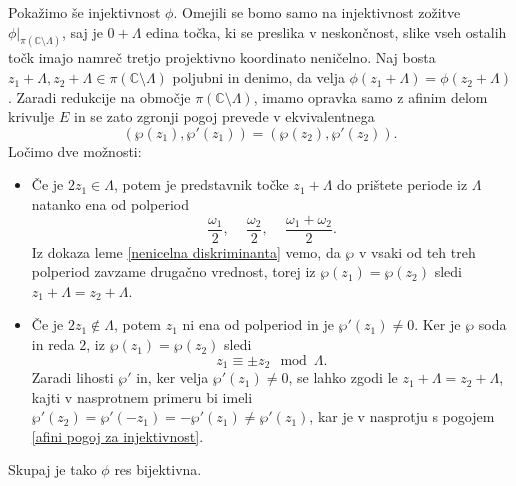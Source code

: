 \documentclass[mat1]{fmfdelo}
\numberwithin{equation}{section}
\newcommand{\C}{\mathbb C}
\newcommand{\om}{\omega}
\theoremstyle{definition}
\begin{document}
\begin{dokaz}
    Pokažimo še injektivnost $\phi$. Omejili se bomo samo na injektivnost zožitve $\phi|_{\pi(\C\setminus\Lambda)}$, saj je $0 + \Lambda$ edina točka, ki se preslika v neskončnost, slike vseh ostalih točk imajo namreč tretjo projektivno koordinato neničelno. Naj bosta $z_1 + \Lambda, z_2 + \Lambda \in \pi(\C \setminus \Lambda)$ poljubni in denimo, da velja $\phi(z_1 + \Lambda) = \phi(z_2 + \Lambda)$. Zaradi redukcije na območje $\pi(\C \setminus \Lambda)$, imamo opravka samo z afinim delom krivulje $E$ in se zato zgronji pogoj prevede v ekvivalentnega 
    \begin{equation}
        \label{afini pogoj za injektivnost}
        (\wp(z_1), \wp'(z_1)) = (\wp(z_2), \wp'(z_2)). 
    \end{equation}  
    Ločimo dve možnosti:
    \begin{itemize}
        \item
        Če je $2z_1 \in \Lambda$, potem je predstavnik točke $z_1 + \Lambda$ do prištete periode iz $\Lambda$ natanko ena od polperiod
        \[
            \frac{\om_1}{2}\text{, } \quad \frac{\om_2}{2}\text{, } \quad \frac{\om_1 + \om_2}{2}.
        \]
        Iz dokaza leme \ref{nenicelna diskriminanta} vemo, da $\wp$ v vsaki od teh treh polperiod zavzame drugačno vrednost, torej iz $\wp(z_1) = \wp(z_2)$ sledi $z_1 + \Lambda = z_2 + \Lambda$.

        \item 
        Če je $2z_1 \not\in \Lambda$, potem $z_1$ ni ena od polperiod in je $\wp'(z_1) \neq 0$. Ker je $\wp$ soda in reda $2$, iz $\wp(z_1) = \wp(z_2)$ sledi
        \[
            z_1  \equiv \pm z_2 \mod{\Lambda}. 
        \]
        Zaradi lihosti $\wp'$ in, ker velja $\wp'(z_1) \neq 0$, se lahko zgodi le $z_1 + \Lambda = z_2 + \Lambda$, kajti v nasprotnem primeru bi imeli $\wp'(z_2) = \wp'(-z_1) = -\wp'(z_1) \neq \wp'(z_1)$, kar je v nasprotju s pogojem \ref{afini pogoj za injektivnost}.
    \end{itemize}
    Skupaj je tako $\phi$ res bijektivna. 


\end{dokaz}
\end{document}
